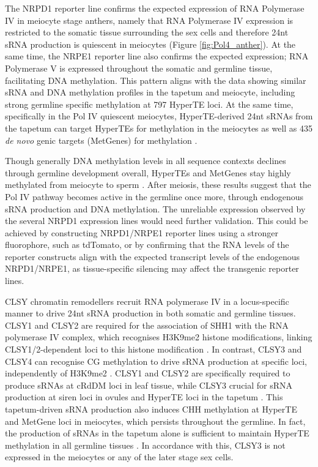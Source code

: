 The NRPD1 reporter line confirms the expected expression of RNA Polymerase IV in meiocyte stage anthers, namely that RNA Polymerase IV expression is restricted to the somatic tissue surrounding the sex cells and therefore 24nt sRNA production is quiescent in meiocytes (Figure \ref{fig:Pol4_anther}). At the same time, the NRPE1 reporter line also confirms the expected expression; RNA Polymerase V is expressed throughout the somatic and germline tissue, facilitating DNA methylation. This pattern aligns with the data showing similar sRNA and DNA methylation profiles in the tapetum and meiocyte, including strong germline specific methylation at 797 HyperTE loci. At the same time, specifically in the Pol IV quiescent meiocytes, HyperTE-derived 24nt sRNAs from the tapetum can target HyperTEs for methylation in the meiocytes as well as 435 \textit{de novo} genic targets (MetGenes) for methylation \cite{RN187,RN199}. 

Though generally DNA methylation levels in all sequence contexts declines through germline development overall, HyperTEs and MetGenes stay highly methylated from meiocyte to sperm \cite{RN17,RN199}. After meiosis, these results suggest that the Pol IV pathway becomes active in the germline once more, through endogenous sRNA production and DNA methylation.  The unreliable expression observed by the several NRPD1 expression lines would need further validation. This could be achieved by constructing NRPD1/NRPE1 reporter lines using a stronger fluorophore, such as tdTomato, or by confirming that the RNA levels of the reporter constructs align with the expected transcript levels of the endogenous NRPD1/NRPE1, as tissue-specific silencing may affect the transgenic reporter lines.

CLSY chromatin remodellers recruit RNA polymerase IV in a locus-specific manner to drive 24nt sRNA production in both somatic and germline tissues. CLSY1 and CLSY2 are required for the association of SHH1 with the RNA polymerase IV complex, which recognises H3K9me2 histone modifications, linking CLSY1/2-dependent loci to this histone modification \cite{RN23}. In contrast, CLSY3 and CLSY4 can recognise CG methylation to drive sRNA production at specific loci, independently of H3K9me2 \cite{RN23}. CLSY1 and CLSY2 are specifically required to produce sRNAs at cRdDM loci in leaf tissue, while CLSY3 crucial for sRNA production at siren loci in ovules and HyperTE loci in the tapetum \cite{RN162,RN23,RN187}. This tapetum-driven sRNA production also induces CHH methylation at HyperTE and MetGene loci in meiocytes, which persists throughout the germline. In fact, the production of sRNAs in the tapetum alone is sufficient to maintain HyperTE methylation in all germline tissues \cite{RN187}. In accordance with this, CLSY3 is not expressed in the meiocytes or any of the later stage sex cells. 

